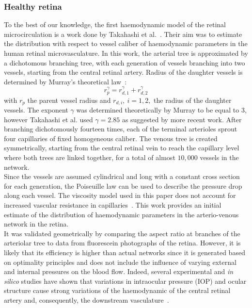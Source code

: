 \documentclass[12pt,a4paper]{journal}
\begin{document}
\subsubsection{Healthy retina}

To the best of our knowledge, the first haemodynamic model of the retinal microcirculation is a work done by Takahashi et al.~\cite{Takahashi_2009}.
Their aim was to estimate the distribution with respect to vessel caliber of haemodynamic parameters in the human retinal microvasculature.
In this work, the arterial tree is approximated by a dichotomous branching tree, with each generation of vessels branching into two vessels, starting from the central retinal artery.
Radius of the daughter vessels is determined by Murray's theoretical law~\cite{Murray_1926}:
\begin{equation}
  \label{eq:MurrayLaw}
  r_p^\gamma = r_{d,1}^\gamma + r_{d,2}^\gamma
\end{equation}
with $r_p$ the parent vessel radius and $r_{d,i},~i=1,2,$ the radius of the daughter vessels.
The exponent $\gamma$ was determined theoretically by Murray to be equal to $3$, however Takahashi et al. used $\gamma=2.85$ as suggested by more recent work.
After branching dichotomously fourteen times, each of the terminal arterioles sprout four capillaries of fixed homogeneous caliber. 
The venous tree is created symmetrically, starting from the central retinal vein to reach the capillary level where both trees are linked together, for a total of almost $10,000$ vessels in the network.\\
Since the vessels are assumed cylindrical and long with a constant cross section for each generation, the Poiseuille law can be used to describe the pressure drop along each vessel.
The viscosity model used in this paper does not account for increased vascular resistance in capillaries~\cite{Haynes_1960}. 
This work provides an initial estimate of the distribution of haemodynamic parameters in the arterio-venous network in the retina. \\
It was validated geometrically by comparing the aspect ratio at branches of the arteriolar tree to data from fluorescein photographs of the retina. 
However, it is likely that its efficiency is higher than actual networks since it is generated based on optimality principles and does not include the influence of varying external and internal pressures on the blood flow.
Indeed, several experimental and \textit{in silico} studies have shown that variations in intraocular pressure (IOP) and ocular structure cause strong variations of the haemodynamic of the central retinal artery and, consequently, the downstream vasculature~\cite{Guidoboni_2014, Harris_1996}.
\end{document}
